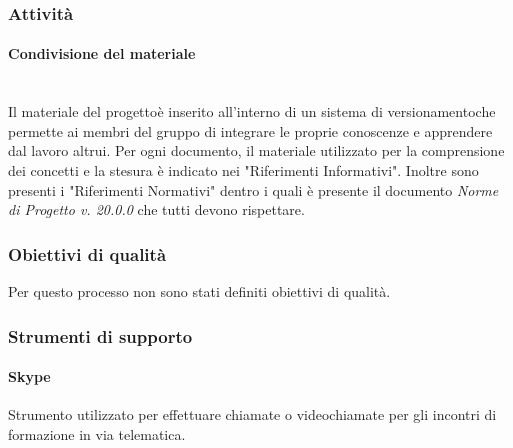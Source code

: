 		\subsubsection{Attività}
			\paragraph{Condivisione del materiale}\mbox{}\\ [1mm]
				Il materiale del progetto\glosp è inserito all'interno di un sistema di versionamento\glosp che permette ai membri del gruppo di integrare le proprie conoscenze e apprendere dal lavoro altrui.
				Per ogni documento, il materiale utilizzato per la comprensione dei concetti e la stesura è indicato nei "Riferimenti Informativi".
				Inoltre sono presenti i "Riferimenti Normativi" dentro i quali è presente il documento \textit{Norme di Progetto v. 20.0.0} che tutti devono rispettare.
		\subsubsection{Obiettivi di qualità}
			Per questo processo non sono stati definiti obiettivi di qualità.
		\subsubsection{Strumenti di supporto}
			\paragraph{Skype}
		 		Strumento utilizzato per effettuare chiamate o videochiamate per gli incontri di formazione in via telematica.
			
